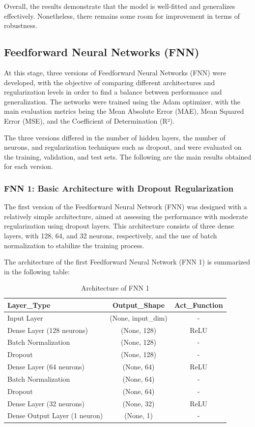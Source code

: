 Overall, the results demonstrate that the model is well-fitted and generalizes effectively. Nonetheless, there remains some room for improvement in terms of robustness.

\subsection{Feedforward Neural Networks (FNN)}

At this stage, three versions of Feedforward Neural Networks (FNN) were developed, with the objective of comparing different architectures and regularization levels in order to find a balance between performance and generalization. The networks were trained using the Adam optimizer, with the main evaluation metrics being the Mean Absolute Error (MAE), Mean Squared Error (MSE), and the Coefficient of Determination (R²).

The three versions differed in the number of hidden layers, the number of neurons, and regularization techniques such as dropout, and were evaluated on the training, validation, and test sets. The following are the main results obtained for each version.

\subsubsection{FNN 1: Basic Architecture with Dropout Regularization}

The first version of the Feedforward Neural Network (FNN) was designed with a relatively simple architecture, aimed at assessing the performance with moderate regularization using dropout layers. This architecture consists of three dense layers, with 128, 64, and 32 neurons, respectively, and the use of batch normalization to stabilize the training process.

The architecture of the first Feedforward Neural Network (FNN 1) is summarized in the following table:

\begin{table}[h!]
\centering
\caption{Architecture of FNN 1}
\begin{tabular}{|l|c|c|}
\hline
\textbf{Layer\_Type} & \textbf{Output\_Shape} & \textbf{Act\_Function} \\ \hline
Input Layer & (None, input\_dim) & - \\ \hline
Dense Layer (128 neurons) & (None, 128) & ReLU \\ \hline
Batch Normalization & (None, 128) & - \\ \hline
Dropout & (None, 128) & - \\ \hline
Dense Layer (64 neurons) & (None, 64) & ReLU \\ \hline
Batch Normalization & (None, 64) & - \\ \hline
Dropout & (None, 64) & - \\ \hline
Dense Layer (32 neurons) & (None, 32) & ReLU \\ \hline
Dense Output Layer (1 neuron) & (None, 1) & - \\ \hline
\end{tabular}
\label{tab:fnn1_architecture}
\end{table}

